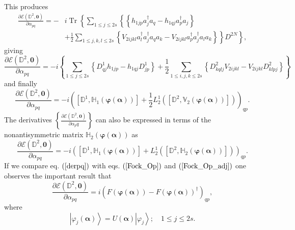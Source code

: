 \documentclass[aps,preprint]{revtex4}%
\begin{document}
This produces%
\begin{align}
\frac{\partial\mathcal{E}\left(  \mathbb{D}^{2},\bm{0}\right)  }%
{\partial\alpha_{pq}}=-  &  i\operatorname{Tr}\left\{  \sum_{1\leq j\leq
2s}\left\{  \left\{  h_{1jp}a_{j}^{\dagger}a_{q}-h_{1qj}a_{p}^{\dagger}%
a_{j}\right\}  \right.  \right. \nonumber\\
&  +\left.  \left.  \frac{1}{2}\sum_{1\leq j,k,l\leq2s}\left\{  V_{2ijkl}%
a_{l}^{\dagger}a_{j}^{\dagger}a_{q}a_{k}-V_{2ijkl}a_{p}^{\dagger}%
a_{j}^{\dagger}a_{l}a_{k}\right\}  \right\}  D^{2N}\right\}  ,
\end{align}
giving%
\begin{equation}
\frac{\partial\mathcal{E}\left(  \mathbb{D}^{2},\bm{0}\right)  }%
{\partial\alpha_{pq}}=-i\left\{  \sum_{1\leq j\leq2s}\left\{  D_{qj}%
^{1}h_{1jp}-h_{1qj}D_{jp}^{1}\right\}  +\frac{1}{2}\sum_{1\leq i,j,k\leq
2s}\left\{  D_{kqlj}^{2}V_{2ijkl}-V_{2ijkl}D_{klpj}^{2}\right\}  \right\}
\end{equation}
and finally
\begin{equation}
\frac{\partial\mathcal{E}\left(  \mathbb{D}^{2},\bm{0}\right)  }%
{\partial\alpha_{pq}}=-i\left(  \left[  \mathbb{D}^{1},\mathbb{H}_{1}\left(
\bm{\varphi}\left(  \bm{\alpha}\right)  \right)  \right]  +\frac{1}{2}%
L_{2}^{1}\left(  \left[  \mathbb{D}^{2},\mathbb{V}_{2}\left(
\bm{\varphi}\left(  \bm{\alpha}\right)  \right)  \right]  \right)  \right)
_{qp}. \label{derpq}%
\end{equation}
The derivatives $\left\{  \frac{\partial\mathcal{E}\left(  \mathbb{D}%
^2,\bm{0}\right)  }{\partial\alpha_pq}\right\}  $ can also be expressed in
terms of the nonantisymmetric matrix $\mathbb{H}_2\left(  \bm{\varphi}\left(
\bm{\alpha}\right)  \right)  $ as
\begin{equation}
\frac{\partial\mathcal{E}\left(  \mathbb{D}^{2},\bm{0}\right)  }%
{\partial\alpha_{pq}}=-i\left(  \left[  \mathbb{D}^{1},\mathbb{H}_{1}\left(
\bm{\varphi}\left(  \bm{\alpha}\right)  \right)  \right]  +L_{2}^{1}\left(
\left[  \mathbb{D}^{2},\mathbb{H}_{2}\left(  \bm{\varphi }\left(
\bm{\alpha}\right)  \right)  \right]  \right)  \right)  _{qp}. \label{derpq1}%
\end{equation}
If we compare eq. $\left(  \ref{derpq}\right)  $ with eqs. $\left(
\ref{Fock_Op}\right)  $ and $\left(  \ref{Fock_Op_adj}\right)  $ one observes
the important result that
\begin{equation}
\frac{\partial\mathcal{E}\left(  \mathbb{D}^{2},\bm{0}\right)  }%
{\partial\alpha_{pq}}=i\left(  F\left(  \bm{\varphi}\left(
\bm{\alpha }\right)  \right)  -F\left(  \bm{\varphi}\left(
\bm{\alpha}\right)  \right)  ^{\dagger}\right)  _{qp},
\end{equation}
where
\begin{equation}
\left\vert \varphi_{j}\left(  \bm{\alpha}\right)  \right\rangle =U\left(
\bm{\alpha}\right)  \left\vert \varphi_{j}\right\rangle ;\quad1\leq j\leq2s.
\end{equation}
\end{document}
